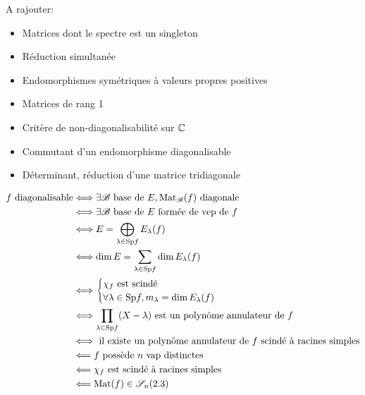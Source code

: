 A rajouter:
\begin{itemize}
    \item Matrices dont le spectre est un singleton
    \item Réduction simultanée
    \item Endomorphismes symétriques à valeurs propres positives
    \item Matrices de rang 1
    \item Critère de non-diagonalisabilité sur $\mathbb{C}$
    \item Commutant d'un endomorphisme diagonalisable 
    \item Déterminant, réduction d'une matrice tridiagonale 
\end{itemize}

\newpage

\begin{Large}
\begin{align*}
    f \text{ diagonalisable} &\Longleftrightarrow \exists \mathscr{B} \text{ base de } E, \mathrm{Mat}_\mathscr{B}(f) \text{ diagonale} \\
    &\Longleftrightarrow \exists \mathscr{B} \text{ base de } E \text{ formée de vep de } f\\
    &\Longleftrightarrow E = \bigoplus_{\lambda \in \mathrm{Sp} f} E_\lambda(f) \\
    &\Longleftrightarrow \dim E = \sum_{\lambda \in \mathrm{Sp} f} \dim E_\lambda(f) \\
    &\Longleftrightarrow 
    \begin{cases}
    \chi_f \text{ est scindé} \\
    \forall \lambda \in \mathrm{Sp} f, m_{\lambda} = \dim E_\lambda(f)
    \end{cases} \\
    &\Longleftrightarrow \prod_{\lambda \in \mathrm{Sp} f}(X-\lambda) \text{ est un polynôme annulateur de } f\\
    &\Longleftrightarrow \text{ il existe un polynôme annulateur de } f \text{ scindé à racines simples} \\
    &\Longleftarrow f \text{ possède } n \text{ vap distinctes} \\
    &\Longleftarrow \chi_f \text{ est scindé à racines simples} \\
    &\Longleftarrow \mathrm{Mat}(f) \in \mathscr{S}_n(2.3)
\end{align*}
\end{Large}
